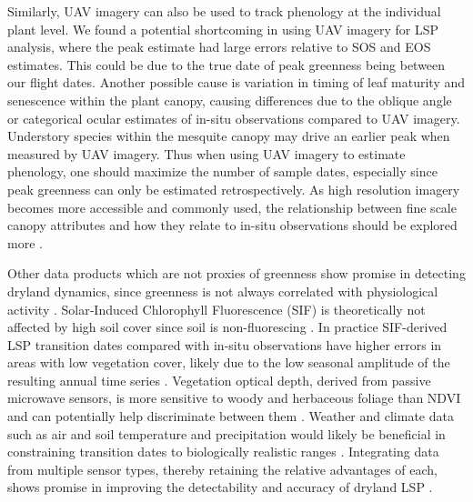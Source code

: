 \documentclass{article}
\begin{document}
Similarly, UAV imagery can also be used to track phenology at the individual plant level. We found a potential shortcoming in using UAV imagery for LSP analysis, where the peak estimate had large errors relative to SOS and EOS estimates. This could be due to the true date of peak greenness being between our flight dates. Another possible cause is variation in timing of leaf maturity and senescence within the plant canopy, causing differences due to the oblique angle or categorical ocular estimates of in-situ observations compared to UAV imagery. Understory species within the mesquite canopy may drive an earlier peak when measured by UAV imagery. Thus when using UAV imagery to estimate phenology, one should maximize the number of sample dates, especially since peak greenness can only be estimated retrospectively. As high resolution imagery becomes more accessible and commonly used, the relationship between fine scale canopy attributes and how they relate to in-situ observations should be explored more \cite{klosterman2018, cheng-vrieling2020}. 

Other data products which are not proxies of greenness show promise in detecting dryland dynamics, since greenness is not always correlated with physiological activity \cite{jeong-schimel2017}. Solar‐Induced Chlorophyll Fluorescence (SIF) is theoretically not affected by high soil cover since soil is non-fluorescing \cite{frankenberg2014, smith2018}. In practice SIF-derived LSP transition dates compared with in-situ observations have higher errors in areas with low vegetation cover, likely due to the low seasonal amplitude of the resulting annual time series \cite{wang-beringer2019}. Vegetation optical depth, derived from passive microwave sensors, is more sensitive to woody and herbaceous foliage than NDVI and can potentially help discriminate between them \cite{andela2013, tian2016}. Weather and climate data such as air and soil temperature and precipitation would likely be beneficial in constraining transition dates to biologically realistic ranges \cite{hudson2011, liu-liu2014, norris2020}. Integrating data from multiple sensor types, thereby retaining the relative advantages of each, shows promise in improving the detectability and accuracy of dryland LSP \cite{andela2013, tian2016, wang-xiao2019, dannenberg2020}.
\end{document}
